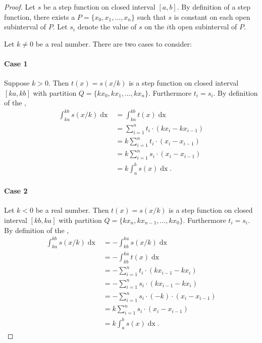 \documentclass{report}
\begin{document}
  \begin{proof}

    Let $s$ be a step function on closed interval $[a, b]$.
    By definition of a step function, there exists a 
      $P = \{x_0, x_1, \ldots, x_n\}$ such that $s$ is constant on each open
      subinterval of $P$.
    Let $s_i$ denote the value of $s$ on the $i$th open subinterval of $P$.

    Let $k \neq 0$ be a real number.
    There are two cases to consider:

    \paragraph{Case 1}%

      Suppose $k > 0$.
      Then $t(x) = s(x / k)$ is a step function on closed interval $[ka, kb]$
        with partition $Q = \{kx_0, kx_1, \ldots, kx_n\}$.
      Furthermore $t_i = s_i$.
      By definition of the ,
        \begin{align*}
          \int_{ka}^{kb} s(x / k) \mathop{dx}
            & = \int_{ka}^{kb} t(x) \mathop{dx} \\
            & = \sum_{i=1}^n t_i \cdot (kx_i - kx_{i-1}) \\
            & = k \sum_{i=1}^n t_i \cdot (x_i - x_{i-1}) \\
            & = k \sum_{i=1}^n s_i \cdot(x_i - x_{i-1}) \\
            & = k \int_a^b s(x) \mathop{dx}.
        \end{align*}

    \paragraph{Case 2}%

      Let $k < 0$ be a real number.
      Then $t(x) = s(x / k)$ is a step function on closed interval $[kb, ka]$
        with partition $Q = \{kx_n, kx_{n-1}, \ldots, kx_0\}$.
      Furthermore $t_i = s_i$.
      By definition of the ,
        \begin{align*}
          \int_{ka}^{kb} s(x / k) \mathop{dx}
            & = -\int_{kb}^{ka} s(x / k) \mathop{dx} \\
            & = -\int_{kb}^{ka} t(x) \mathop{dx} \\
            & = -\sum_{i=1}^n t_i \cdot (kx_{i-1} - kx_i) \\
            & = -\sum_{i=1}^n s_i \cdot (kx_{i-1} - kx_i) \\
            & = -\sum_{i=1}^n s_i \cdot (-k) \cdot (x_i - x_{i-1}) \\
            & = k \sum_{i=1}^n s_i \cdot (x_i - x_{i-1}) \\
            & = k \int_a^b s(x) \mathop{dx}.
        \end{align*}

  \end{proof}
\end{document}
